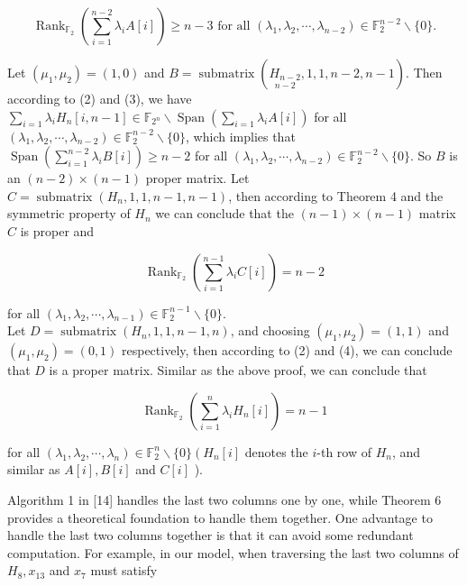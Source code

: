 \documentclass[10pt]{article}
\begin{document}
\begin{equation*}
\operatorname{Rank}_{\mathbb{F}_{2}}\left(\sum_{i=1}^{n-2} \lambda_{i} A[i]\right) \geq n-3 \text { for all }\left(\lambda_{1}, \lambda_{2}, \cdots, \lambda_{n-2}\right) \in \mathbb{F}_{2}^{n-2} \backslash\{0\} . \tag{3}
\end{equation*}


Let $\left(\mu_{1}, \mu_{2}\right)=(1,0)$ and $B=\operatorname{submatrix}\left(\underset{n-2}{H_{n-2}}, 1,1, n-2, n-1\right)$. Then according to (2) and (3), we have $\sum_{i=1} \lambda_{i} H_{n}[i, n-1] \in \mathbb{F}_{2^{n}} \backslash \operatorname{Span}\left(\sum_{i=1} \lambda_{i} A[i]\right)$ for all $\left(\lambda_{1}, \lambda_{2}, \cdots, \lambda_{n-2}\right) \in \mathbb{F}_{2}^{n-2} \backslash\{0\}$, which implies that $\operatorname{Span}\left(\sum_{i=1}^{n-2} \lambda_{i} B[i]\right) \geq n-2$ for all $\left(\lambda_{1}, \lambda_{2}, \cdots, \lambda_{n-2}\right) \in \mathbb{F}_{2}^{n-2} \backslash\{0\}$. So $B$ is an $(n-2) \times(n-1)$ proper matrix. Let $C=\operatorname{submatrix}\left(H_{n}, 1,1, n-1, n-1\right)$, then according to Theorem 4 and the symmetric property of $H_{n}$ we can conclude that the $(n-1) \times(n-1)$ matrix $C$ is proper and


\begin{equation*}
\operatorname{Rank}_{\mathbb{F}_{2}}\left(\sum_{i=1}^{n-1} \lambda_{i} C[i]\right)=n-2 \tag{4}
\end{equation*}


for all $\left(\lambda_{1}, \lambda_{2}, \cdots, \lambda_{n-1}\right) \in \mathbb{F}_{2}^{n-1} \backslash\{0\}$.\\
Let $D=\operatorname{submatrix}\left(H_{n}, 1,1, n-1, n\right)$, and choosing $\left(\mu_{1}, \mu_{2}\right)=(1,1)$ and $\left(\mu_{1}, \mu_{2}\right)=(0,1)$ respectively, then according to (2) and (4), we can conclude that $D$ is a proper matrix. Similar as the above proof, we can conclude that

$$
\operatorname{Rank}_{\mathbb{F}_{2}}\left(\sum_{i=1}^{n} \lambda_{i} H_{n}[i]\right)=n-1
$$

for all $\left(\lambda_{1}, \lambda_{2}, \cdots, \lambda_{n}\right) \in \mathbb{F}_{2}^{n} \backslash\{0\}\left(H_{n}[i]\right.$ denotes the $i$-th row of $H_{n}$, and similar as $A[i], B[i]$ and $C[i]$ ).

Algorithm 1 in [14] handles the last two columns one by one, while Theorem 6 provides a theoretical foundation to handle them together. One advantage to handle the last two columns together is that it can avoid some redundant computation. For example, in our model, when traversing the last two columns of $H_{8}, x_{13}$ and $x_{7}$ must satisfy
\end{document}
